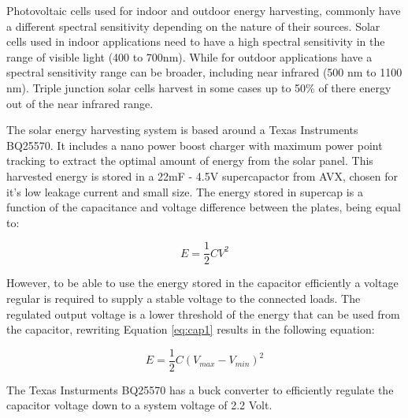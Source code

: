 \documentclass[letterpaper, 10 pt, conference]{ieeeconf}  %
\begin{document}

Photovoltaic cells used for indoor and outdoor energy harvesting, commonly have a different spectral sensitivity depending on the nature of their sources.
Solar cells used in indoor applications need to have a high spectral sensitivity in the range of visible light (400 to 700nm).
While for outdoor applications have a spectral sensitivity range can be broader, including near infrared  (500 nm to 1100 nm).
Triple junction solar cells harvest in some cases up to 50\% of there energy out of the near infrared range.


The solar energy harvesting system is based around a Texas Instruments BQ25570. 
It includes a nano power boost charger with maximum power point tracking to extract the optimal amount of energy from the solar panel. 
This harvested energy is stored in a 22mF - 4.5V supercapactor from AVX, chosen for it's low leakage current and small size.
The energy stored in supercap is a function of the capacitance and voltage difference between the plates, being equal to:

\begin{equation}
\label{eq:cap1}
E = \frac{1}{2}CV^{2}
\end{equation}

However, to be able to use the energy stored in the capacitor efficiently a voltage regular is required to supply a stable voltage to the connected loads.
The regulated output voltage is a lower threshold of the energy that can be used from the capacitor, rewriting Equation \ref{eq:cap1} results in the following equation:

\begin{equation}
\label{eq:cap2}
E = \frac{1}{2}C(V_{max} - V_{min})^{2}
\end{equation}

The Texas Insturments BQ25570 has a buck converter to efficiently regulate the capacitor voltage down to a system voltage of 2.2 Volt.

\end{document}
